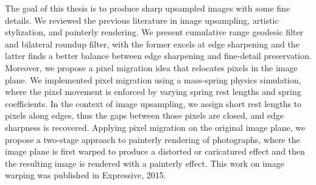The goal of this thesis is to produce sharp upsampled images with some fine details. We reviewed the previous literature in image upsampling, artistic stylization, and painterly rendering. We present cumulative range geodesic filter and bilateral roundup filter, with the former excels at edge sharpening and the latter finds a better balance between edge sharpening and fine-detail preservation. Moreover, we propose a pixel migration idea that relocates pixels in the image plane. We implemented pixel migration using a mass-spring physics simulation, where the pixel movement is enforced by varying spring rest lengths and spring coefficients. In the context of image upsampling, we assign short rest lengths to pixels along edges, thus the gaps between those pixels are closed, and edge sharpness is recovered. Applying pixel migration on the original image plane, we propose a two-stage approach to painterly rendering of photographs, where the image plane is first warped to  produce a distorted or caricatured effect and then the resulting image is rendered with a painterly effect. This work on image warping was published in Expressive, 2015. 